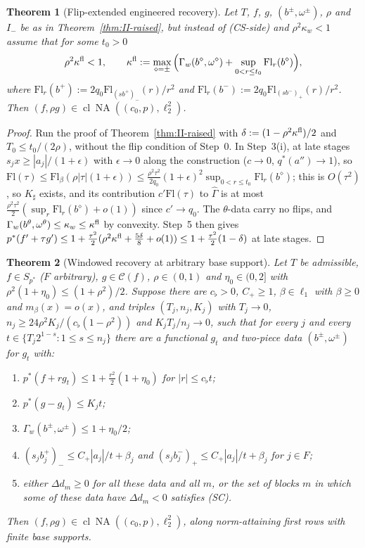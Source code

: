 \documentclass[10pt]{amsart}
\newtheorem{theorem}{Theorem}[section]
\theoremstyle{definition}
\theoremstyle{remark}
\newcommand{\NA}{\operatorname{NA}}
\newcommand{\Cset}{\mathcal C}
\newcommand{\cl}{\operatorname{cl}}
\begin{document}
\begin{theorem}[Flip-extended engineered recovery]\label{thm:II-flipext}
Let $T$, $f$, $g$, $(b^\pm,\omega^\pm)$, $\rho$ and $I_-$ be as in
Theorem~\textup{\ref{thm:II-raised}}, but instead of \textup{(CS-side)} and
$\rho^2\kappa_w<1$ assume that for some $t_0>0$
\[
 \rho^2\kappa^{\rm fl}<1,\qquad\kappa^{\rm fl}:=\max_{\diamond=\pm}\Big(
 \Gamma_w(b^\diamond,\omega^\diamond)+\sup_{0<r\le t_0}\mathrm{Fl}_r(b^\diamond)
 \Big),
\]
where $\mathrm{Fl}_r(b^+):=2q_0\mathrm{Fl}_{(sb^+)_-}(r)/r^2$ and
$\mathrm{Fl}_r(b^-):=2q_0\mathrm{Fl}_{(sb^-)_+}(r)/r^2$.  Then
$(f,\rho g)\in\cl\NA((c_0,p),\ell_2^2)$.
\end{theorem}

\begin{proof}
Run the proof of Theorem~\ref{thm:II-raised} with $\delta:=(1-\rho^2
\kappa^{\rm fl})/2$ and $T_0\le t_0/(2\rho)$, without the flip condition of
Step~0.  In Step~3(i), at late stages $s_jx\ge|a_j|/(1+\epsilon)$ with
$\epsilon\to0$ along the construction ($c\to0$, $q^*(a'')\to1$), so
$\mathrm{Fl}(\tau)\le\mathrm{Fl}_\beta(\rho|\tau|(1+\epsilon))\le\frac{\rho^2\tau^2}
{2q_0}(1+\epsilon)^2\sup_{0<r\le t_0}\mathrm{Fl}_r(b^\diamond)$; this is
$O(\tau^2)$, so $K_\sharp$ exists, and its contribution $c'\mathrm{Fl}(\tau)$ to
$\hat\Gamma$ is at most $\frac{\rho^2\tau^2}2(\sup_r\mathrm{Fl}_r(b^\diamond)+
o(1))$ since $c'\to q_0$.  The $\theta$-data carry no flips, and
$\Gamma_w(b^\theta,\omega^\theta)\le\kappa_w\le\kappa^{\rm fl}$ by convexity.
Step~5 then gives $p^*(f'+\tau g')\le1+\frac{\tau^2}2(\rho^2\kappa^{\rm fl}+
\frac{5\delta}8+o(1))\le1+\frac{\tau^2}2(1-\delta)$ at late stages.
\end{proof}

\begin{theorem}[Windowed recovery at arbitrary base support]
\label{thm:II-masterinf}
Let $T$ be admissible, $f\in S_{p^*}$ \textup{(}$F$ arbitrary\textup{)},
$g\in\Cset(f)$, $\rho\in(0,1)$ and $\eta_0\in(0,2]$ with
$\rho^2(1+\eta_0)\le(1+\rho^2)/2$.  Suppose there are $c_\flat>0$, $C_+\ge1$,
$\beta\in\ell_1$ with $\beta\ge0$ and $m_\beta(x)=o(x)$, and triples
$(T_j,n_j,K_j)$ with $T_j\to0$, $n_j\ge24\rho^2K_j/(c_\flat(1-\rho^2))$ and
$K_jT_j/n_j\to0$, such that for every $j$ and every
$t\in\{T_j2^{1-s}:1\le s\le n_j\}$ there are a functional $g_t$ and two-piece
data $(b^\pm,\omega^\pm)$ for $g_t$ with:
\begin{enumerate}
\item[(i)] $p^*(f+rg_t)\le1+\frac{r^2}2(1+\eta_0)$ for $|r|\le c_\flat t$;
\item[(ii)] $p^*(g-g_t)\le K_jt$;
\item[(iii)] $\Gamma_w(b^\pm,\omega^\pm)\le1+\eta_0/2$;
\item[(iv)] $(s_jb^+_j)_-\le C_+|a_j|/t+\beta_j$ and $(s_jb^-_j)_+\le
C_+|a_j|/t+\beta_j$ for $j\in F$;
\item[(v)] either $\Delta d_m\ge0$ for all these data and all $m$, or the
set of blocks $m$ in which some of these data have $\Delta d_m<0$
satisfies \textup{(SC)}.
\end{enumerate}
Then $(f,\rho g)\in\cl\NA((c_0,p),\ell_2^2)$, along norm-attaining first rows
with finite base supports.
\end{theorem}
\end{document}
